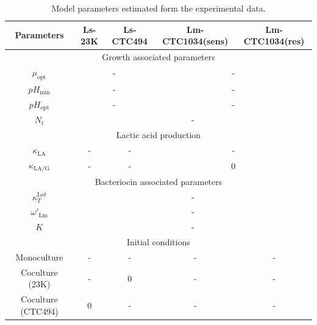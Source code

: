\documentclass[10pt,1p,authoryear]{elsarticle}
\numberwithin{equation}{section}
\begin{document}
\begin{table}[H]
    \centering\small
    \begin{tabular}{ccccc}
        \textbf{Parameters} \hspace{5mm}& \textbf{Ls-23K} \hspace{5mm}& \textbf{Ls-CTC494} \hspace{5mm}& \textbf{Lm-CTC1034(sens)} \hspace{5mm}& \textbf{Lm-CTC1034(res)} \\
    \toprule
    \multicolumn{5}{c}{Growth associated parameters}\\
    \midrule
    $\mu_\text{opt}$ &  \multicolumn{2}{c}{ - } & \multicolumn{2}{c}{ - }\\
    $pH_\text{min}$ &  \multicolumn{2}{c}{ - } & \multicolumn{2}{c}{ - }\\
    $pH_\text{opt}$ &  \multicolumn{2}{c}{ - } & \multicolumn{2}{c}{ - }\\
    $N_t$ & \multicolumn{4}{c}{-}\\
    \midrule
    \multicolumn{5}{c}{Lactic acid production}\\
    \midrule
    $\kappa_\text{LA}$ & - & -  &\multicolumn{2}{c}{ - } \\
    $\kappa_\text{LA/G}$ & - & -  &\multicolumn{2}{c}{ 0 } \\
    \midrule
    \multicolumn{5}{c}{Bacteriocin associated parameters}\\
    \midrule
    $\kappa_T^{\text{Ls} \delta}$ & \multicolumn{4}{c}{ - } \\
    $\omega'_\text{Lm}$ & \multicolumn{4}{c}{-}\\
    $K$ & \multicolumn{4}{c}{-}\\
    \midrule
    \multicolumn{5}{c}{Initial conditions}\\
    \midrule
    Monoculture         & - & - & - & - \\
    Coculture (23K)     & - & 0 & - & - \\
    Coculture (CTC494)  & 0 & - & - & - \\
    \end{tabular}
    \caption{
        Model parameters estimated form the experimental data.
     }
    \label{tab:case_study_parameters}
\end{table}

%

\newpage
\end{document}
